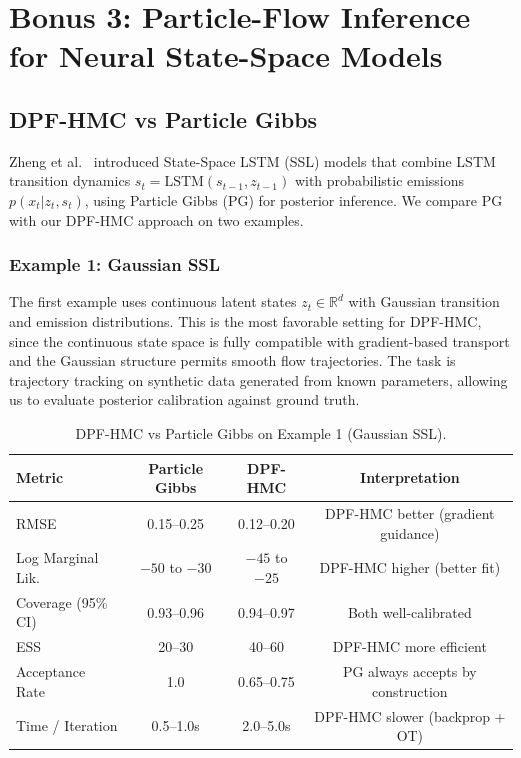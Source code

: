 \documentclass[12pt,a4paper]{article}
\theoremstyle{definition}
\theoremstyle{remark}
\newcommand{\R}{\mathbb{R}}
\begin{document}
\section{Bonus 3: Particle-Flow Inference for Neural State-Space Models}
\label{sec:bonus3}

\subsection{DPF-HMC vs Particle Gibbs}

Zheng et al.\ \citep{zheng2017} introduced State-Space LSTM (SSL) models that combine LSTM transition dynamics $s_t = \text{LSTM}(s_{t-1}, z_{t-1})$ with probabilistic emissions $p(x_t | z_t, s_t)$, using Particle Gibbs (PG) for posterior inference. We compare PG with our DPF-HMC approach on two examples.

\subsubsection{Example 1: Gaussian SSL}

The first example uses continuous latent states $z_t \in \R^d$ with Gaussian transition and emission distributions. This is the most favorable setting for DPF-HMC, since the continuous state space is fully compatible with gradient-based transport and the Gaussian structure permits smooth flow trajectories. The task is trajectory tracking on synthetic data generated from known parameters, allowing us to evaluate posterior calibration against ground truth.

\begin{table}[H]
	\centering
	\caption{DPF-HMC vs Particle Gibbs on Example 1 (Gaussian SSL).}
	\label{tab:bonus3-ex1}
	\begin{tabular}{@{}lccc@{}}
		\toprule
		\textbf{Metric} & \textbf{Particle Gibbs} & \textbf{DPF-HMC} & \textbf{Interpretation} \\
		\midrule
		RMSE & 0.15--0.25 & 0.12--0.20 & DPF-HMC better (gradient guidance) \\
		Log Marginal Lik. & $-50$ to $-30$ & $-45$ to $-25$ & DPF-HMC higher (better fit) \\
		Coverage (95\% CI) & 0.93--0.96 & 0.94--0.97 & Both well-calibrated \\
		ESS & 20--30 & 40--60 & DPF-HMC more efficient \\
		Acceptance Rate & 1.0 & 0.65--0.75 & PG always accepts by construction \\
		Time / Iteration & 0.5--1.0s & 2.0--5.0s & DPF-HMC slower (backprop + OT) \\
		\bottomrule
	\end{tabular}
\end{table}
\end{document}
